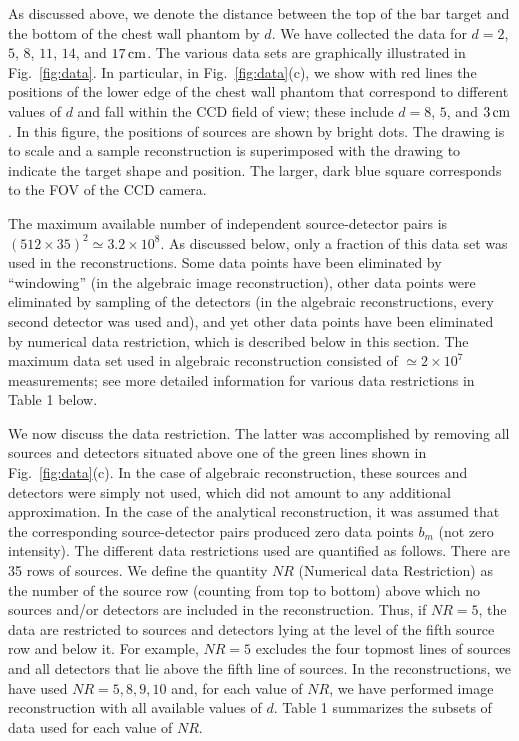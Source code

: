 As discussed above, we denote the distance between the top of the bar target and the bottom of the chest wall phantom by $d$. We have collected the data for $d=2$, $5$, $8$, $11$, $14$, and $17\,{\rm cm}$. The various data sets are graphically illustrated in Fig.~\ref{fig:data}. In particular, in Fig.~\ref{fig:data}(c), we show with red lines the positions of the lower edge of the chest wall phantom that correspond to different values of $d$ and fall within the CCD field of view; these include $d=8$, $5$, and $3\,{\rm cm}$. In this figure, the positions of sources are shown by bright dots. The drawing is to scale and a sample reconstruction is superimposed with the drawing to indicate the target shape and position. The larger, dark blue square corresponds to the FOV of the CCD camera.

The maximum available number of independent source-detector pairs is $(512\times 35)^2\simeq 3.2\times 10^8$. As discussed below, only a fraction of this data set was used in the reconstructions. Some data
points have been eliminated by ``windowing'' (in the algebraic image reconstruction), other data points were eliminated by sampling of the detectors (in the algebraic reconstructions, every second detector was
used and), and yet other data points have been eliminated by numerical data restriction, which is described below in this section. The maximum data set used in algebraic reconstruction consisted of $\simeq 2\times 10^7$ measurements; see more detailed information for various data restrictions in Table 1 below.

We now discuss the data restriction. The latter was accomplished by removing all sources and detectors situated above one of the green lines shown in Fig.~\ref{fig:data}(c). In the case of algebraic reconstruction, these sources and detectors were simply not used, which did not amount to any additional approximation. In the case of the analytical reconstruction, it was assumed that the corresponding source-detector pairs produced zero data points $b_m$ (not zero intensity). The different data restrictions used are quantified as follows. There are 35 rows of sources. We define the quantity $NR$
(Numerical data Restriction) as the number of the source row (counting from top to bottom) above which no sources and/or detectors are included in the reconstruction.  Thus, if $NR=5$, the data are restricted to sources and detectors lying at the level of the fifth source row and below it. For example, $NR=5$ excludes the four topmost lines of sources and all detectors that lie above the fifth line of
sources. In the reconstructions, we have used $NR=5, 8, 9, 10$ and, for each value of $NR$, we have performed image reconstruction with all available values of $d$. Table 1 summarizes the subsets of data
used for each value of $NR$.


